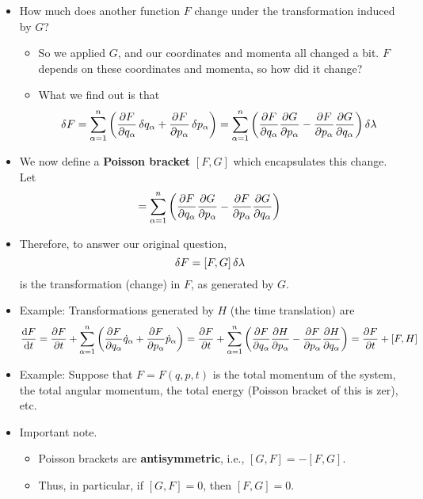 \documentclass[../notes.tex]{subfiles}
\begin{document}
\begin{itemize}
    \item How much does another function $F$ change under the transformation induced by $G$?
    \begin{itemize}
        \item So we applied $G$, and our coordinates and momenta all changed a bit. $F$ depends on these coordinates and momenta, so how did it change?
        \item What we find out is that
        \begin{equation*}
            \var{F} = \sum_{\alpha=1}^n\left( \pdv{F}{q_\alpha}\var{q_\alpha}+\pdv{F}{p_\alpha}\var{p_\alpha} \right)
            = \sum_{\alpha=1}^n\left( \pdv{F}{q_\alpha}\pdv{G}{p_\alpha}-\pdv{F}{p_\alpha}\pdv{G}{q_\alpha} \right)\var{\lambda}
        \end{equation*}
    \end{itemize}
    \item We now define a \textbf{Poisson bracket} $[F,G]$ which encapsulates this change. Let
    \begin{equation*}
        [F,G] = \sum_{\alpha=1}^n\left( \pdv{F}{q_\alpha}\pdv{G}{p_\alpha}-\pdv{F}{p_\alpha}\pdv{G}{q_\alpha} \right)
    \end{equation*}
    \item Therefore, to answer our original question,
    \begin{equation*}
        \var{F} = [F,G]\var{\lambda}
    \end{equation*}
    is the transformation (change) in $F$, as generated by $G$.
    \item Example: Transformations generated by $H$ (the time translation) are
    \begin{equation*}
        \dv{F}{t} = \pdv{F}{t}+\sum_{\alpha=1}^n\left( \pdv{F}{q_\alpha}\dot{q}_\alpha+\pdv{F}{p_\alpha}\dot{p}_\alpha \right)
        = \pdv{F}{t}+\sum_{\alpha=1}^n\left( \pdv{F}{q_\alpha}\pdv{H}{p_\alpha}-\pdv{F}{p_\alpha}\pdv{H}{q_\alpha} \right)
        = \pdv{F}{t}+[F,H]
    \end{equation*}
    \item Example: Suppose that $F=F(q,p,t)$ is the total momentum of the system, the total angular momentum, the total energy (Poisson bracket of this is zer), etc.
    \item Important note.
    \begin{itemize}
        \item Poisson brackets are \textbf{antisymmetric}, i.e., $[G,F]=-[F,G]$.
        \item Thus, in particular, if $[G,F]=0$, then $[F,G]=0$.

\end{itemize}
\end{itemize}
\end{document}

